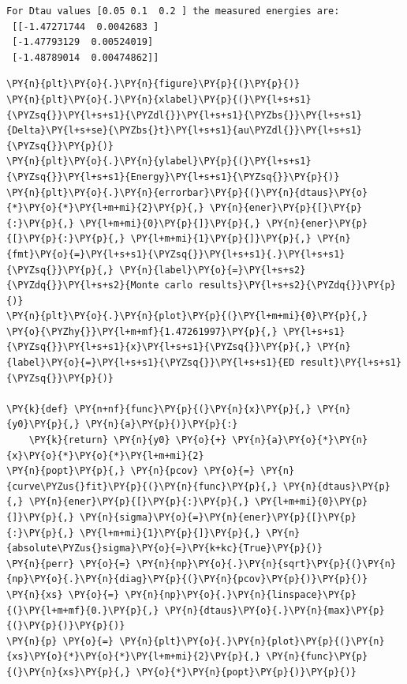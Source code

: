     \begin{Verbatim}[commandchars=\\\{\}]
For Dtau values [0.05 0.1  0.2 ] the measured energies are:
 [[-1.47271744  0.0042683 ]
 [-1.47793129  0.00524019]
 [-1.48789014  0.00474862]]
    \end{Verbatim}

    \begin{tcolorbox}[breakable, size=fbox, boxrule=1pt, pad at break*=1mm,colback=cellbackground, colframe=cellborder]
\begin{Verbatim}[commandchars=\\\{\}]
\PY{n}{plt}\PY{o}{.}\PY{n}{figure}\PY{p}{(}\PY{p}{)}
\PY{n}{plt}\PY{o}{.}\PY{n}{xlabel}\PY{p}{(}\PY{l+s+s1}{\PYZsq{}}\PY{l+s+s1}{\PYZdl{}}\PY{l+s+s1}{\PYZbs{}}\PY{l+s+s1}{Delta}\PY{l+s+se}{\PYZbs{}t}\PY{l+s+s1}{au\PYZdl{}}\PY{l+s+s1}{\PYZsq{}}\PY{p}{)}
\PY{n}{plt}\PY{o}{.}\PY{n}{ylabel}\PY{p}{(}\PY{l+s+s1}{\PYZsq{}}\PY{l+s+s1}{Energy}\PY{l+s+s1}{\PYZsq{}}\PY{p}{)}
\PY{n}{plt}\PY{o}{.}\PY{n}{errorbar}\PY{p}{(}\PY{n}{dtaus}\PY{o}{*}\PY{o}{*}\PY{l+m+mi}{2}\PY{p}{,} \PY{n}{ener}\PY{p}{[}\PY{p}{:}\PY{p}{,} \PY{l+m+mi}{0}\PY{p}{]}\PY{p}{,} \PY{n}{ener}\PY{p}{[}\PY{p}{:}\PY{p}{,} \PY{l+m+mi}{1}\PY{p}{]}\PY{p}{,} \PY{n}{fmt}\PY{o}{=}\PY{l+s+s1}{\PYZsq{}}\PY{l+s+s1}{.}\PY{l+s+s1}{\PYZsq{}}\PY{p}{,} \PY{n}{label}\PY{o}{=}\PY{l+s+s2}{\PYZdq{}}\PY{l+s+s2}{Monte carlo results}\PY{l+s+s2}{\PYZdq{}}\PY{p}{)}
\PY{n}{plt}\PY{o}{.}\PY{n}{plot}\PY{p}{(}\PY{l+m+mi}{0}\PY{p}{,} \PY{o}{\PYZhy{}}\PY{l+m+mf}{1.47261997}\PY{p}{,} \PY{l+s+s1}{\PYZsq{}}\PY{l+s+s1}{x}\PY{l+s+s1}{\PYZsq{}}\PY{p}{,} \PY{n}{label}\PY{o}{=}\PY{l+s+s1}{\PYZsq{}}\PY{l+s+s1}{ED result}\PY{l+s+s1}{\PYZsq{}}\PY{p}{)}

\PY{k}{def} \PY{n+nf}{func}\PY{p}{(}\PY{n}{x}\PY{p}{,} \PY{n}{y0}\PY{p}{,} \PY{n}{a}\PY{p}{)}\PY{p}{:}
    \PY{k}{return} \PY{n}{y0} \PY{o}{+} \PY{n}{a}\PY{o}{*}\PY{n}{x}\PY{o}{*}\PY{o}{*}\PY{l+m+mi}{2}
\PY{n}{popt}\PY{p}{,} \PY{n}{pcov} \PY{o}{=} \PY{n}{curve\PYZus{}fit}\PY{p}{(}\PY{n}{func}\PY{p}{,} \PY{n}{dtaus}\PY{p}{,} \PY{n}{ener}\PY{p}{[}\PY{p}{:}\PY{p}{,} \PY{l+m+mi}{0}\PY{p}{]}\PY{p}{,} \PY{n}{sigma}\PY{o}{=}\PY{n}{ener}\PY{p}{[}\PY{p}{:}\PY{p}{,} \PY{l+m+mi}{1}\PY{p}{]}\PY{p}{,} \PY{n}{absolute\PYZus{}sigma}\PY{o}{=}\PY{k+kc}{True}\PY{p}{)}
\PY{n}{perr} \PY{o}{=} \PY{n}{np}\PY{o}{.}\PY{n}{sqrt}\PY{p}{(}\PY{n}{np}\PY{o}{.}\PY{n}{diag}\PY{p}{(}\PY{n}{pcov}\PY{p}{)}\PY{p}{)}
\PY{n}{xs} \PY{o}{=} \PY{n}{np}\PY{o}{.}\PY{n}{linspace}\PY{p}{(}\PY{l+m+mf}{0.}\PY{p}{,} \PY{n}{dtaus}\PY{o}{.}\PY{n}{max}\PY{p}{(}\PY{p}{)}\PY{p}{)}
\PY{n}{p} \PY{o}{=} \PY{n}{plt}\PY{o}{.}\PY{n}{plot}\PY{p}{(}\PY{n}{xs}\PY{o}{*}\PY{o}{*}\PY{l+m+mi}{2}\PY{p}{,} \PY{n}{func}\PY{p}{(}\PY{n}{xs}\PY{p}{,} \PY{o}{*}\PY{n}{popt}\PY{p}{)}\PY{p}{)}


\end{Verbatim}
\end{tcolorbox}
